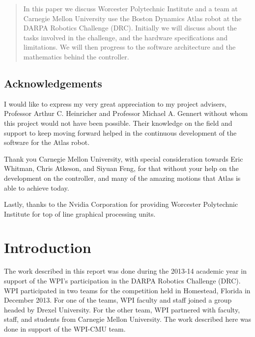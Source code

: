 \documentclass[12pt]{report}
\begin{document}
\setcounter{page}{1}
\begin{abstract}

In this paper we discuss Worcester Polytechnic Institute and a team at Carnegie Mellon University use the Boston Dynamics Atlas robot at the DARPA Robotics Challenge (DRC). Initially we will discuss about the tasks involved in the challenge, and the hardware specifications and limitations. We will then progress to the software architecture and the mathematics behind the controller. 


\end{abstract}

\newpage

\section*{Acknowledgements}
I would like to express my very great appreciation to my project advisers, Professor Arthur C. Heinricher and Professor Michael A. Gennert without whom this project would not have been possible. Their knowledge on the field and support to keep moving forward helped in the continuous development of the software for the Atlas robot. 

Thank you Carnegie Mellon University, with special consideration towards Eric Whitman, Chris Atkeson, and Siyuan Feng, for that without your help on the development on the controller, and many of the amazing motions that Atlas is able to achieve today. 

Lastly, thanks to the Nvidia Corporation for providing Worcester Polytechnic Institute for top of line graphical processing units. 

\newpage
\setcounter{page}{1}
\renewcommand{\thepage}{\roman{page}}
\pagestyle{plain}

\newpage
\tableofcontents
\newpage
\renewcommand{\thepage}{\arabic{page}}
\setcounter{page}{1}
\pagestyle{plain}
\chapter{Introduction}
The work described in this report was done during the 2013-14 academic year in support of the WPI’s participation in the DARPA Robotics Challenge (DRC). WPI participated in two teams for the competition held in Homestead, Florida in December 2013.  For one of the teams, WPI faculty and staff joined a group headed by Drexel University.  For the other team, WPI partnered with faculty, staff, and students from Carnegie Mellon University. The work described here was done in support of the WPI-CMU team.  
\end{document}
